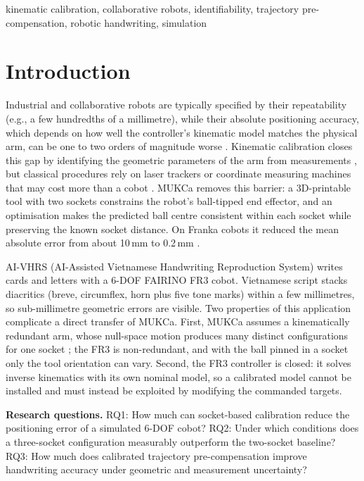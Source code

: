 \documentclass[conference]{IEEEtran}
\begin{document}
\begin{IEEEkeywords}
kinematic calibration, collaborative robots, identifiability, trajectory pre-compensation, robotic handwriting, simulation
\end{IEEEkeywords}

\section{Introduction}
Industrial and collaborative robots are typically specified by their repeatability (e.g., a few hundredths of a millimetre),
while their absolute positioning accuracy, which depends on how well the controller's kinematic model matches the physical
arm, can be one to two orders of magnitude worse \cite{nubiola2013,hollerbach1996}. Kinematic calibration closes this gap
by identifying the geometric parameters of the arm from measurements \cite{everett1987,zhuang1992,hollerbach1996}, but
classical procedures rely on laser trackers or coordinate measuring machines that may cost more than a cobot
\cite{nubiola2013,franzese2026mukca}. MUKCa \cite{franzese2026mukca,franzese2025arxiv} removes this barrier: a
3D-printable tool with two sockets constrains the robot's ball-tipped end effector, and an optimisation makes the
predicted ball centre consistent within each socket while preserving the known socket distance. On Franka cobots it reduced
the mean absolute error from about 10\,mm to 0.2\,mm \cite{franzese2026mukca}.

AI-VHRS (AI-Assisted Vietnamese Handwriting Reproduction System) writes cards and letters with a 6-DOF FAIRINO FR3 cobot.
Vietnamese script stacks diacritics (breve, circumflex, horn plus five tone marks) within a few millimetres, so
sub-millimetre geometric errors are visible. Two properties of this application complicate a direct transfer of MUKCa.
First, MUKCa assumes a kinematically redundant arm, whose null-space motion produces many distinct configurations for one
socket \cite{franzese2026mukca}; the FR3 is non-redundant, and with the ball pinned in a socket only the tool orientation
can vary. Second, the FR3 controller is closed: it solves inverse kinematics with its own nominal model, so a calibrated
model cannot be installed and must instead be exploited by modifying the commanded targets.

\textbf{Research questions.} RQ1: How much can socket-based calibration reduce the positioning error of a simulated 6-DOF
cobot? RQ2: Under which conditions does a three-socket configuration measurably outperform the two-socket baseline? RQ3: How
much does calibrated trajectory pre-compensation improve handwriting accuracy under geometric and measurement uncertainty?
\end{document}
